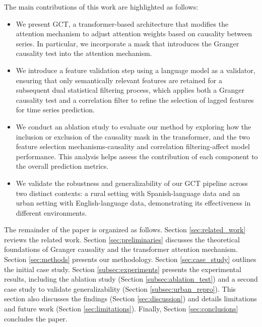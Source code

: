 \documentclass[acmsmall]{acmart}
\begin{document}
The main contributions of this work are highlighted as follows:
\begin{itemize}   
    \item We present GCT, a transformer-based architecture that modifies the attention mechanism to adjust attention weights based on causality between series. In particular, we incorporate a mask that introduces the Granger causality test into the attention mechanism.
    \item We introduce a feature validation step {\color{black}using a language model} as a validator, ensuring that only semantically relevant features are retained for a subsequent dual statistical filtering process, which applies both a Granger causality test and a correlation filter to refine the selection of lagged features for time series prediction.
    \item We conduct an ablation study to evaluate our method by exploring how the inclusion or exclusion of the causality mask in the transformer, and the two feature selection mechanisms-causality and correlation filtering-affect model performance. This analysis helps assess the contribution of each component to the overall prediction metrics.
    \item {\color{black}We validate the robustness and generalizability of our GCT pipeline across two distinct contexts: a rural setting with Spanish-language data and an urban setting with English-language data, demonstrating its effectiveness in different environments.}
\end{itemize}



The remainder of the paper is organized as follows. Section \ref{sec:related_work} reviews the related work. Section \ref{sec:preliminaries} discusses the theoretical foundations of Granger causality and the transformer attention mechanism. Section \ref{sec:methods} presents our methodology. Section \ref{sec:case_study} outlines the {\color{black}initial case study}. Section \ref{subsec:experiments} presents the experimental results, including the ablation study (Section \ref{subsec:ablation_test}) {\color{black}and a second case study to validate generalizability (Section \ref{subsec:urban_repro}). This section also discusses the findings (Section \ref{sec:discussion}) and details limitations and future work (Section \ref{sec:limitations})}. Finally, Section \ref{sec:conclusions} concludes the paper.


\end{document}
